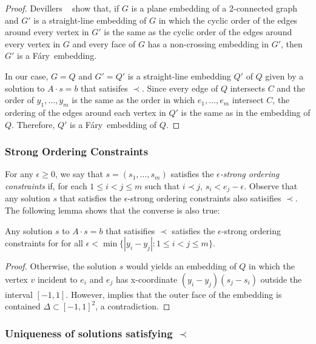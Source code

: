 \documentclass{patmorin}
\newcommand{\Fary}{Fáry}
\begin{document}
\begin{proof}
   Devillers \etal\ \cite[Lemma~16]{devillers.liotta.ea:checking} show
   that, if $G$ is a plane embedding of a 2-connected graph and $G'$
   is a straight-line embedding of $G$ in which the cyclic order of the
   edges around every vertex in $G'$ is the same as the cyclic order
   of the edges around every vertex in $G$ and every face of $G$
   has a non-crossing embedding in $G'$, then $G'$ is a \Fary\ embedding.

   In our case, $G=Q$ and $G'=Q'$ is a straight-line embedding $Q'$ of
   $Q$ given by a solution to $A\cdot s = b$ that satisifes $\prec$.
   Since every edge of $Q$ intersects $C$ and the order of
   $y_1,\ldots,y_m$ is the same as the order in which $e_1,\ldots,e_m$
   intersect $C$, the ordering of the edges around each vertex in $Q'$
   is the same as in the embedding of $Q$. Therefore, $Q'$ is a \Fary\
   embedding of $Q$.
\end{proof}


\subsubsection{Strong Ordering Constraints}

For any $\epsilon \ge 0$, we say that $s=(s_1,\ldots,s_m)$ satisfies
the \emph{$\epsilon$-strong ordering constraints} if, for each $1\le
i<j\le m$ such that $i\prec j$, $s_i < e_j - \epsilon$.  Observe that any
solution $s$ that satisfies the $\epsilon$-strong ordering constraints
also satisifies $\prec$. The following lemma shows that the converse is
also true:

\begin{lem}
   Any solution $s$ to $A\cdot s=b$ that satisifies $\prec$ satisfies the
   $\epsilon$-strong ordering constraints for
   for all $\epsilon<\min\{|y_i-y_j| : 1\le i< j\le m\}$.
\end{lem}

\begin{proof}
   Otherwise, the solution $s$ would yields an embedding of $Q$ in
   which the vertex $v$ incident to $e_i$ and $e_j$ has x-coordinate
   $(y_i-y_j)(s_j-s_i)$ outside the interval $[-1,1]$. However,
    implies that the outer face of the
   embedding is contained $\Delta\subset[-1,1]^2$, a contradiction.
\end{proof}

\subsubsection{Uniqueness of solutions satisfying $\prec$}
\end{document}
